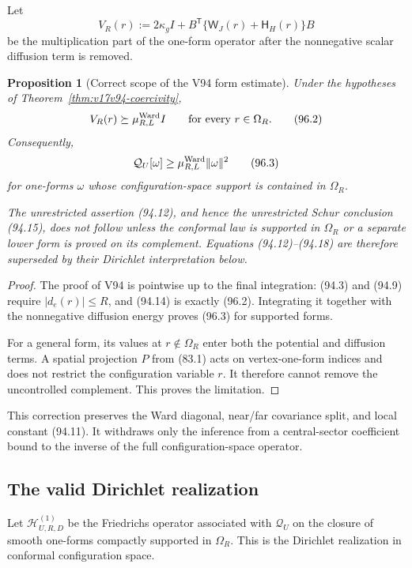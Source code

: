\documentclass[11pt]{article}
\newtheorem{proposition}[theorem]{Proposition}
\theoremstyle{remark}
\begin{document}
Let
\[
 V_R(r):=2\kappa_gI+B^{\mathsf T}
 \{\mathsf W_J(r)+\mathsf H_H(r)\}B                 \tag{96.1}
\]
be the multiplication part of the one-form operator after the
nonnegative scalar diffusion term is removed.

\begin{proposition}[Correct scope of the V94 form estimate]
\label{prop:v17v96-erratum}
Under the hypotheses of Theorem~\ref{thm:v17v94-coercivity},
\[
 V_R(r)\succeq\mu_{R,L}^{\rm Ward}I
 \qquad\text{for every }r\in\Omega_R.               \tag{96.2}
\]
Consequently,
\[
 \mathcal Q_U[\omega]
 \geq\mu_{R,L}^{\rm Ward}\|\omega\|^2              \tag{96.3}
\]
for one-forms \(\omega\) whose configuration-space support is
contained in \(\Omega_R\).

The unrestricted assertion (94.12), and hence the unrestricted Schur
conclusion (94.15), does not follow unless the conformal law is
supported in \(\Omega_R\) or a separate lower form is proved on its
complement.  Equations (94.12)--(94.18) are therefore superseded by
their Dirichlet interpretation below.
\end{proposition}

\begin{proof}
The proof of V94 is pointwise up to the final integration: (94.3) and
(94.9) require \(|d_e(r)|\leq R\), and (94.14) is exactly (96.2).
Integrating it together with the nonnegative diffusion energy proves
(96.3) for supported forms.

For a general form, its values at \(r\notin\Omega_R\) enter both the
potential and diffusion terms.  A spatial projection \(P\) from
(83.1) acts on vertex-one-form indices and does not restrict the
configuration variable \(r\).  It therefore cannot remove the
uncontrolled complement.  This proves the limitation.
\end{proof}

This correction preserves the Ward diagonal, near/far covariance
split, and local constant (94.11).  It withdraws only the inference
from a central-sector coefficient bound to the inverse of the full
configuration-space operator.

\subsection{The valid Dirichlet realization}

Let \(\mathscr H_{U,R,D}^{(1)}\) be the Friedrichs operator associated
with \(\mathcal Q_U\) on the closure of smooth one-forms compactly
supported in \(\Omega_R\).  This is the Dirichlet realization in
conformal configuration space.
\end{document}
